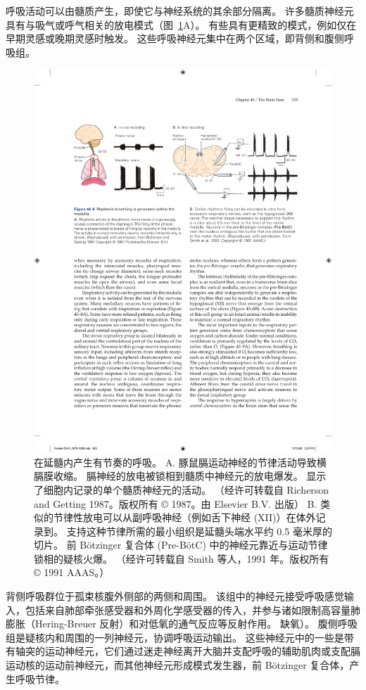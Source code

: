 呼吸活动可以由髓质产生，即使它与神经系统的其余部分隔离。
许多髓质神经元具有与吸气或呼气相关的放电模式（图~\ref{fig:40_8}A）。
有些具有更精致的模式，例如仅在早期灵感或晚期灵感时触发。
这些呼吸神经元集中在两个区域，即背侧和腹侧呼吸组。


\begin{figure}[htbp]
	\centering
	\includegraphics[width=0.95\linewidth]{chap40/fig_40_8}
	\caption{在延髓内产生有节奏的呼吸。 A. 豚鼠膈运动神经的节律活动导致横膈膜收缩。 膈神经的放电被锁相到髓质中神经元的放电爆发。 显示了细胞内记录的单个髓质神经元的活动。 （经许可转载自 Richerson and Getting 1987。版权所有 © 1987。由 Elsevier B.V. 出版） B. 类似的节律性放电可以从副呼吸神经（例如舌下神经 (XII)）在体外记录到。 支持这种节律所需的最小组织是延髓头端水平约 0.5 毫米厚的切片。 前 Bötzinger 复合体 (Pre-BötC) 中的神经元靠近与运动节律锁相的疑核火爆。 （经许可转载自 Smith 等人，1991 年。版权所有 © 1991 AAAS。）}
	\label{fig:40_8}
\end{figure}


背侧呼吸群位于孤束核腹外侧部的两侧和周围。
该组中的神经元接受呼吸感觉输入，包括来自肺部牵张感受器和外周化学感受器的传入，并参与诸如限制高容量肺膨胀（Hering-Breuer 反射）和对低氧的通气反应等反射作用。 缺氧）。
腹侧呼吸组是疑核内和周围的一列神经元，协调呼吸运动输出。
这些神经元中的一些是带有轴突的运动神经元，它们通过迷走神经离开大脑并支配呼吸的辅助肌肉或支配膈运动核的运动前神经元，而其他神经元形成模式发生器，前 Bötzinger 复合体，产生呼吸节律。


